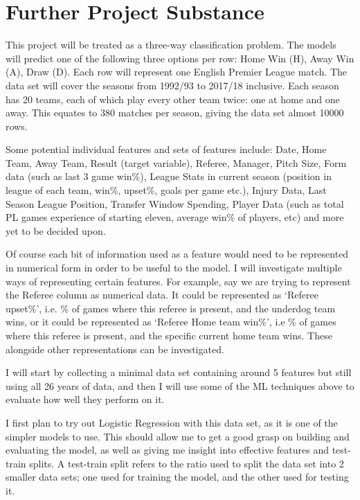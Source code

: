 \documentclass[12pt,a4paper,twoside]{article}
\begin{document}
\section*{Further Project Substance}

This project will be treated as a three-way classification problem. The models will predict one of the following three options per row: Home Win (H), Away Win (A), Draw (D). Each row will represent one English Premier League match. The data set will cover the seasons from 1992/93 to 2017/18 inclusive. Each season has 20 teams, each of which play every other team twice: one at home and one away. This equates to 380 matches per season, giving the data set almost 10000 rows.

Some potential individual features and sets of features include: Date, Home Team, Away Team, Result (target variable), Referee, Manager, Pitch Size, Form data (such as last 3 game win\%), League Stats in current season (position in league of each team, win\%, upset\%, goals per game etc.), Injury Data, Last Season League Position, Transfer Window Spending, Player Data (such as total PL games experience of starting eleven, average win\% of players, etc) and more yet to be decided upon.

Of course each bit of information used as a feature would need to be represented in numerical form in order to be useful to the model. I will investigate multiple ways of representing certain features. For example, say we are trying to represent the Referee column as numerical data. It could be represented as `Referee upset\%', i.e. \% of games where this referee is present, and the underdog team wins, or it could be represented as `Referee Home team win\%', i.e \% of games where this referee is present, and the specific current home team wins. These alongside other representations can be investigated.

I will start by collecting a minimal data set containing around 5 features but still using all 26 years of data, and then I will use some of the ML techniques above to evaluate how well they perform on it. 

I first plan to try out Logistic Regression with this data set, as it is one of the simpler models to use. This should allow me to get a good grasp on building and evaluating the model, as well as giving me insight into effective features and test-train splits. A test-train split refers to the ratio used to split the data set into 2 smaller data sets; one used for training the model, and the other used for testing it.
\end{document}
